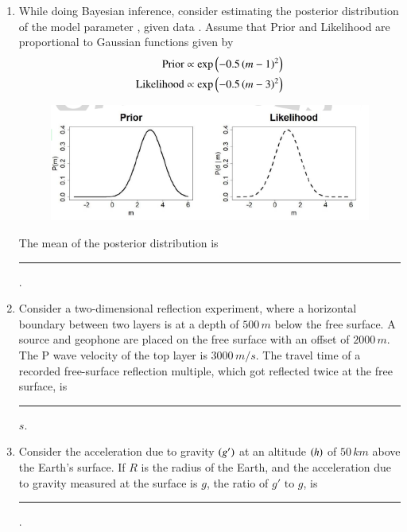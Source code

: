 \documentclass[journal,12pt,onecolumn]{IEEEtran}
\theoremstyle{remark}
\begin{document}
\begin{enumerate}
\item While doing Bayesian inference, consider estimating the posterior distribution of the model parameter , given data . Assume that Prior and Likelihood are proportional to Gaussian functions given by
\begin{align*}
\text{Prior} &\propto \exp\left(-0.5\left(m-1\right)^2\right) \\
\text{Likelihood} &\propto \exp\left(-0.5\left(m-3\right)^2\right)
\end{align*}
\begin{figure}[H]
    \centering
    \includegraphics[width=0.8\columnwidth]{figs/fig15.png}
    \caption{}
    \label{fig:q63}
\end{figure}
The mean of the posterior distribution is \rule{3cm}{0.15mm}.  \hfill{}

\item Consider a two-dimensional reflection experiment, where a horizontal boundary between two layers is at a depth of $500\,m$ below the free surface. A source and geophone are placed on the free surface with an offset of $2000\,m$. The P wave velocity of the top layer is $3000 \,m/s$. The travel time of a recorded free-surface reflection multiple, which got reflected twice at the free surface, is \rule{3cm}{0.15mm} $s$.  \hfill{}

\item Consider the acceleration due to gravity $\left(g'\right)$ at an altitude $\left(h\right) $ of $50\,km$ above the Earth's surface. If $R$ is the radius of the Earth, and the acceleration due to gravity measured at the surface is $g$, the ratio of $g' \text{ to } g$, is \rule{3cm}{0.15mm}.  \hfill{}

\end{enumerate}
\end{document}
